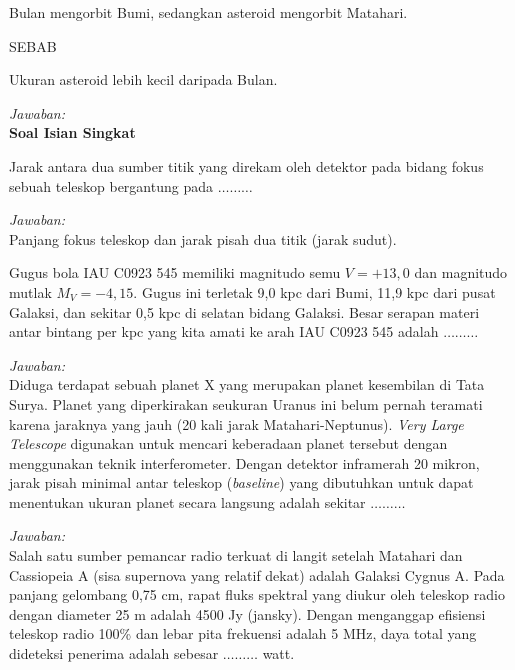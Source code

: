 \documentclass[11pt,fleqn, a4paper]{exam}
\begin{document}
\begin{questions}
\vspace{0.5cm}
\question Bulan mengorbit Bumi, sedangkan asteroid mengorbit Matahari.
\begin{center}
SEBAB
\end{center}
\noindent Ukuran asteroid lebih kecil daripada Bulan.

\textit{Jawaban: }\\


\vspace{1cm}
\textbf{Soal Isian Singkat}

\vspace{0.5cm} 
\question Jarak antara dua sumber titik yang direkam oleh detektor pada bidang fokus sebuah teleskop bergantung pada $\ldots\ldots\ldots$

\textit{Jawaban: }\\
Panjang fokus teleskop dan jarak pisah dua titik (jarak sudut).


\vspace{0.5cm}
\question Gugus bola IAU C0923 545 memiliki magnitudo semu $V = +13,0$ dan magnitudo mutlak $M_V = -4,15$. Gugus ini terletak 9,0 kpc dari Bumi, 11,9 kpc dari pusat Galaksi, dan sekitar 0,5 kpc di selatan bidang Galaksi. Besar serapan materi antar bintang per kpc yang kita amati ke arah IAU C0923 545 adalah $\ldots\ldots\ldots$

\textit{Jawaban: }\\


\vspace{0.5cm}
\question Diduga terdapat sebuah planet X yang merupakan planet kesembilan di Tata Surya. Planet yang diperkirakan seukuran Uranus ini belum pernah teramati karena jaraknya yang jauh (20 kali jarak Matahari-Neptunus). \textit{Very Large Telescope} digunakan untuk mencari keberadaan planet tersebut dengan menggunakan teknik interferometer. Dengan detektor inframerah 20 mikron, jarak pisah minimal antar teleskop (\textit{baseline}) yang dibutuhkan untuk dapat menentukan ukuran planet secara langsung adalah sekitar $\ldots\ldots\ldots$

\textit{Jawaban: }\\


\vspace{0.5cm}
\question Salah satu sumber pemancar radio terkuat di langit setelah Matahari dan Cassiopeia A (sisa supernova yang relatif dekat) adalah Galaksi Cygnus A. Pada panjang gelombang 0,75 cm, rapat fluks spektral yang diukur oleh teleskop radio dengan diameter 25 m adalah 4500 Jy (jansky). Dengan menganggap efisiensi teleskop radio 100\% dan lebar pita frekuensi adalah 5 MHz, daya total yang dideteksi penerima adalah sebesar $\ldots\ldots\ldots$ watt.  


\end{questions}
\end{document}
